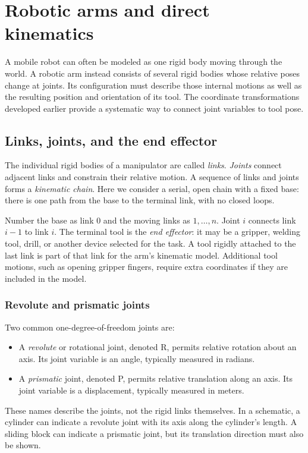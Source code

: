 \chapter{Robotic arms and direct kinematics}
\label{chap:lecture10}

A mobile robot can often be modeled as one rigid body moving through the
world. A robotic arm instead consists of several rigid bodies whose relative
poses change at joints. Its configuration must describe those internal
motions as well as the resulting position and orientation of its tool.
The coordinate transformations developed earlier provide a systematic way
to connect joint variables to tool pose.

\section{Links, joints, and the end effector}
The individual rigid bodies of a manipulator are called \emph{links}.
\emph{Joints} connect adjacent links and constrain their relative motion.
A sequence of links and joints forms a \emph{kinematic chain}. Here we
consider a serial, open chain with a fixed base: there is one path from
the base to the terminal link, with no closed loops.

Number the base as link 0 and the moving links as $1,\ldots,n$.
Joint $i$ connects link $i-1$ to link $i$. The terminal tool is the
\emph{end effector}: it may be a gripper, welding tool, drill, or another
device selected for the task. A tool rigidly attached to the last link is
part of that link for the arm's kinematic model. Additional tool motions,
such as opening gripper fingers, require extra coordinates if they are
included in the model.

\subsection{Revolute and prismatic joints}
Two common one-degree-of-freedom joints are:
\begin{itemize}
\item A \emph{revolute} or rotational joint, denoted R, permits relative
rotation about an axis. Its joint variable is an angle, typically measured
in radians.
\item A \emph{prismatic} joint, denoted P, permits relative translation
along an axis. Its joint variable is a displacement, typically measured
in meters.
\end{itemize}
These names describe the joints, not the rigid links themselves. In a
schematic, a cylinder can indicate a revolute joint with its axis along
the cylinder's length. A sliding block can indicate a prismatic joint,
but its translation direction must also be shown.

